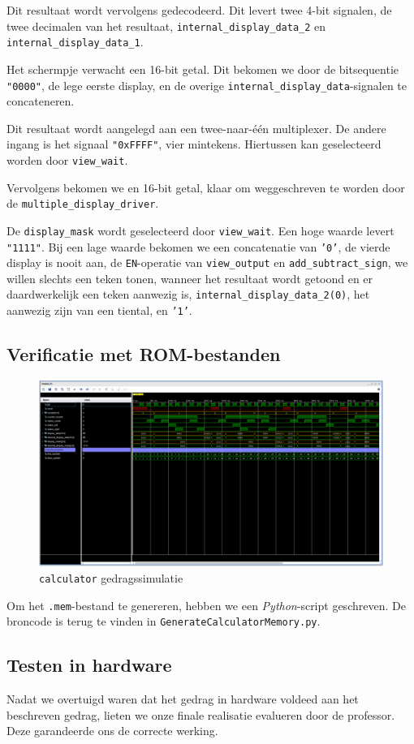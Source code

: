 \documentclass[titlepage]{article}
\begin{document}
Dit resultaat wordt vervolgens gedecodeerd.
Dit levert twee 4-bit signalen, de twee decimalen van het resultaat, \texttt{internal\_display\_data\_2} en \texttt{internal\_display\_data\_1}.

Het schermpje verwacht een 16-bit getal.
Dit bekomen we door de bitsequentie \texttt{"0000"}, de lege eerste display, en de overige \texttt{internal\_display\_data}-signalen te concateneren.

Dit resultaat wordt aangelegd aan een twee-naar-één multiplexer.
De andere ingang is het signaal \texttt{"0xFFFF"}, vier mintekens.
Hiertussen kan geselecteerd worden door \texttt{view\_wait}.

Vervolgens bekomen we en 16-bit getal, klaar om weggeschreven te worden door de \texttt{multiple\_display\_driver}.

De \texttt{display\_mask} wordt geselecteerd door \texttt{view\_wait}.
Een hoge waarde levert \texttt{"1111"}.
Bij een lage waarde bekomen we een concatenatie van \texttt{'0'},
de vierde display is nooit aan,
de \texttt{EN}-operatie van \texttt{view\_output} en \texttt{add\_subtract\_sign},
we willen slechts een teken tonen, wanneer het resultaat wordt getoond en er daardwerkelijk een teken aanwezig is,
\texttt{internal\_display\_data\_2(0)},
het aanwezig zijn van een tiental, en \texttt{'1'}.


\subsection{Verificatie met ROM-bestanden}

\begin{figure}[h!]
    \centering
    \includegraphics[trim={0 400px 0 0}, clip, width=0.8\linewidth]{calculator_gedragssimulatie.PNG}
    \caption{\texttt{calculator} gedragssimulatie}
    \label{fig:calculator_gedragssimulatie}
\end{figure}

Om het \texttt{.mem}-bestand te genereren,
hebben we een \textit{Python}-script geschreven.
De broncode is terug te vinden in \texttt{GenerateCalculatorMemory.py}.

\subsection{Testen in hardware}

Nadat we overtuigd waren dat het gedrag in hardware voldeed aan het beschreven gedrag,
lieten we onze finale realisatie evalueren door de professor.
Deze garandeerde ons de correcte werking.
\end{document}
